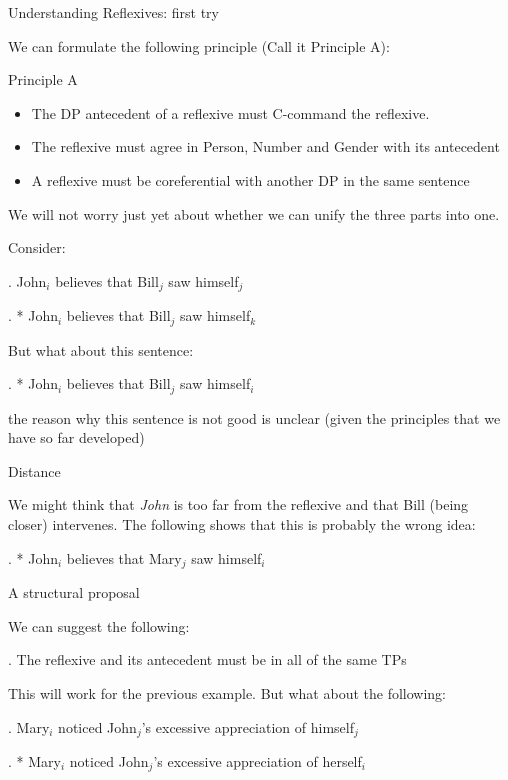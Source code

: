 \begin{frame}
  {Understanding Reflexives: first try}

We can formulate the following principle (Call it Principle A):

\begin{block}
  {Principle A}
\begin{itemize}
\item The DP antecedent of a reflexive must C-command the reflexive.
\item The reflexive must agree in Person, Number and Gender with its antecedent
\item A reflexive must be coreferential with another DP in the same sentence
\end{itemize}
\end{block}


We will not worry just yet about whether we can unify the three parts into one.
\end{frame}


\begin{frame}
  Consider:


\ex.  John$_i$ believes that Bill$_j$ saw himself$_j$

\ex. * John$_i$ believes that Bill$_j$ saw himself$_k$


\end{frame}

\begin{frame}
  But what about this sentence:


\ex. 
* John$_i$ believes that Bill$_j$ saw himself$_i$


the reason why this sentence is not good is unclear (given the principles that we have so far developed)

\end{frame}


\begin{frame}
  {Distance}

We might think that \textit{John} is too far from the reflexive and that Bill (being closer) intervenes.  The following shows that this is probably the wrong idea:

\ex.
* John$_i$ believes that Mary$_j$ saw himself$_i$

\end{frame}

\begin{frame}
  {A structural proposal}

We can suggest the following:

\ex.  
The reflexive and its antecedent must be in all of the same TPs

This will work for the previous example.  But what about the following:

\ex.
Mary$_i$ noticed John$_j$'s excessive appreciation of himself$_j$

\ex.
* Mary$_i$ noticed John$_j$'s excessive appreciation of herself$_i$

\end{frame}


